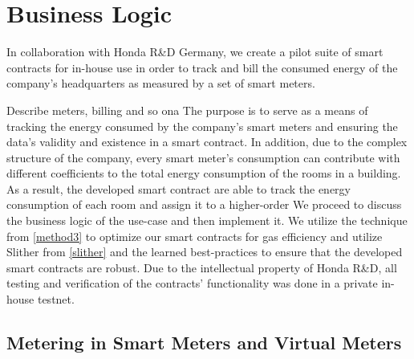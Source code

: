 
\section{Business Logic} \label{business-logic}
In collaboration with Honda R\&D Germany, we create a pilot suite of smart contracts for in-house use in order to track and bill the consumed energy of the company's headquarters as measured by a set of smart meters. 

Describe meters, billing and so ona
The purpose is to serve as a means of tracking the energy consumed by the company's smart meters and ensuring the data's validity and existence in a smart contract. In addition, due to the complex structure of the company, every smart meter's consumption can contribute with different coefficients to the total energy consumption of the rooms in a building. As a result, the developed smart contract are able to track the energy consumption of each room and assign it to a higher-order 
We proceed to discuss the business logic of the use-case and then implement it. We utilize the technique from \ref{method3} to optimize our smart contracts for gas efficiency and utilize Slither from \ref{slither} and the learned best-practices to ensure that the developed smart contracts are robust. Due to the intellectual property of Honda R\&D, all testing and verification of the contracts' functionality was done in a private in-house testnet.


\subsection{Metering in Smart Meters and Virtual Meters}

